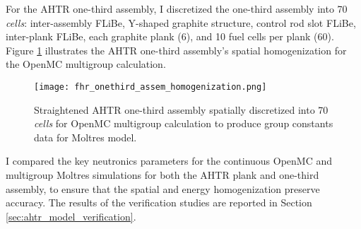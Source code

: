 For the \gls{AHTR} one-third assembly, I discretized the one-third assembly into 
70 \textit{cells}: inter-assembly \gls{FLiBe}, Y-shaped graphite structure, control 
rod slot \gls{FLiBe}, inter-plank \gls{FLiBe}, each graphite plank (6), and 10 fuel 
cells per plank (60).
Figure \ref{fig:fhr_onethird_assem_homogenization} illustrates the \gls{AHTR} 
one-third assembly's spatial homogenization for the OpenMC multigroup calculation. 
\begin{figure}[htbp]
    \centering
    \texttt{[image: fhr\_onethird\_assem\_homogenization.png]}
    \raggedright
    \caption{Straightened \acrfull{AHTR} one-third assembly spatially discretized into 
    70 \textit{cells} for OpenMC multigroup calculation to produce group constants 
    data for Moltres model.}
    \label{fig:fhr_onethird_assem_homogenization}
\end{figure}

I compared the key neutronics parameters for the continuous OpenMC and multigroup 
Moltres simulations for both the \gls{AHTR} plank and one-third assembly, to ensure 
that the spatial and energy homogenization preserve accuracy.
The results of the verification studies are reported in Section 
\ref{sec:ahtr_model_verification}.

